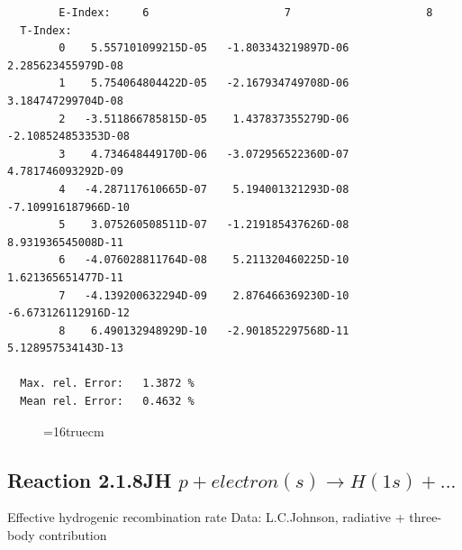 \documentclass[12pt,dvips]{article}
\begin{document}
\begin{small}
\begin{verbatim}
        E-Index:     6                     7                     8
  T-Index:
        0    5.557101099215D-05   -1.803343219897D-06    2.285623455979D-08
        1    5.754064804422D-05   -2.167934749708D-06    3.184747299704D-08
        2   -3.511866785815D-05    1.437837355279D-06   -2.108524853353D-08
        3    4.734648449170D-06   -3.072956522360D-07    4.781746093292D-09
        4   -4.287117610665D-07    5.194001321293D-08   -7.109916187966D-10
        5    3.075260508511D-07   -1.219185437626D-08    8.931936545008D-11
        6   -4.076028811764D-08    5.211320460225D-10    1.621365651477D-11
        7   -4.139200632294D-09    2.876466369230D-10   -6.673126112916D-12
        8    6.490132948929D-10   -2.901852297568D-11    5.128957534143D-13

  Max. rel. Error:   1.3872 %
  Mean rel. Error:   0.4632 %

\end{verbatim}\end{small}
\begin{figure} \label{2.1.5FU}
\epsfxsize=16truecm
\end{figure}
\newpage

\subsection{
  Reaction 2.1.8JH  $ p + electron(s) \rightarrow H(1s) + ...$
}

   Effective hydrogenic recombination rate
   Data: L.C.Johnson, radiative + three-body contribution
\end{document}
